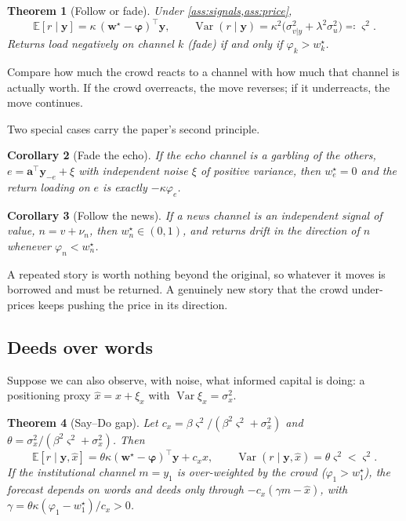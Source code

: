 \documentclass[11pt,a4paper]{article}
\theoremstyle{sci}
\newtheorem{theorem}{Theorem}[section]
\newtheorem{corollary}[theorem]{Corollary}
\theoremstyle{scidef}
\newcommand{\E}{\mathbb{E}}
\newcommand{\w}{\bm{w}}
\newcommand{\y}{\bm{y}}
\newcommand{\bphi}{\bm{\varphi}}
\DeclareMathOperator{\Var}{Var}
\begin{document}
\begin{theorem}[Follow or fade]\label{thm:followfade}
Under \cref{ass:signals,ass:price},
\[
  \E[r\mid\y]=\kappa\,(\w^\star-\bphi)^\top\y,\qquad \Var(r\mid\y)=\kappa^2\big(\sigma^2_{v|y}+\lambda^2\sigma_u^2\big)\eqqcolon\varsigma^2 .
\]
Returns load negatively on channel $k$ (\emph{fade}) if and only if $\varphi_k>w^\star_k$.
\end{theorem}

\begin{inwords}
Compare how much the crowd reacts to a channel with how much that channel is actually worth. If the crowd overreacts, the move reverses; if it underreacts, the move continues.
\end{inwords}

Two special cases carry the paper's second principle.

\begin{corollary}[Fade the echo]\label{cor:echo}
If the echo channel is a garbling of the others, $e=\bm a^\top\y_{-e}+\xi$ with independent noise $\xi$ of positive variance, then $w^\star_e=0$ and the return loading on $e$ is exactly $-\kappa\varphi_e$.
\end{corollary}

\begin{corollary}[Follow the news]\label{cor:news}
If a news channel is an independent signal of value, $n=v+\nu_n$, then $w^\star_n\in(0,1)$, and returns drift in the direction of $n$ whenever $\varphi_n<w^\star_n$.
\end{corollary}

\begin{inwords}
A repeated story is worth nothing beyond the original, so whatever it moves is borrowed and must be returned. A genuinely new story that the crowd under-prices keeps pushing the price in its direction.
\end{inwords}

\subsection{Deeds over words}

Suppose we can also observe, with noise, what informed capital is doing: a positioning proxy $\hat x=x+\xi_x$ with $\Var\xi_x=\sigma_x^2$.

\begin{theorem}[Say--Do gap]\label{thm:saydo}
Let $c_x=\beta\varsigma^2/(\beta^2\varsigma^2+\sigma_x^2)$ and $\theta=\sigma_x^2/(\beta^2\varsigma^2+\sigma_x^2)$. Then
\[
  \E[r\mid\y,\hat x]=\theta\kappa(\w^\star-\bphi)^\top\y+c_x\hat x,\qquad \Var(r\mid\y,\hat x)=\theta\varsigma^2<\varsigma^2 .
\]
If the institutional channel $m=y_1$ is over-weighted by the crowd ($\varphi_1>w^\star_1$), the forecast depends on words and deeds only through $-c_x(\gamma m-\hat x)$, with $\gamma=\theta\kappa(\varphi_1-w^\star_1)/c_x>0$.
\end{theorem}
\end{document}

